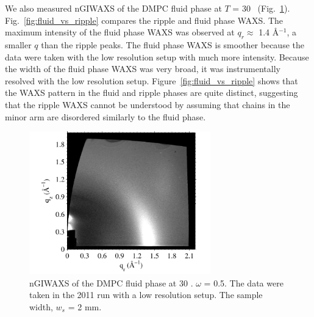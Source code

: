 We also measured nGIWAXS of the DMPC fluid phase at $T$ = 30 \textcelsius\
(Fig.~\ref{fig:fluid_036}).
Fig.~\ref{fig:fluid_vs_ripple} compares the ripple and fluid phase WAXS.
The maximum intensity of the fluid phase
WAXS was observed at $q_r \approx$ 1.4 \AA$^{-1}$, a smaller $q$ than 
the ripple peaks. The fluid phase WAXS is smoother because the data were
taken with the low resolution setup with much more intensity. Because the
width of the fluid phase WAXS was very broad, it was instrumentally resolved
with the low resolution setup. Figure~\ref{fig:fluid_vs_ripple} shows that
the WAXS pattern in the fluid and ripple phases are quite distinct,
suggesting that the ripple WAXS cannot be understood by assuming that 
chains in the minor arm are disordered similarly to the fluid phase. 


\begin{figure}[htbp]
  \centering
  \includegraphics[trim=0 0 0 0,clip,width=0.7\textwidth]{figures/ripple/nGIWAXS/fluid_036}
  \caption{nGIWAXS of the DMPC fluid phase at 30 \textcelsius. $\omega$ =
  0.5\textdegree. The data were taken in the 2011 run with a low resolution 
  setup. The sample width, $w_s$ = 2 mm.}
  \label{fig:fluid_036}
\end{figure} 

